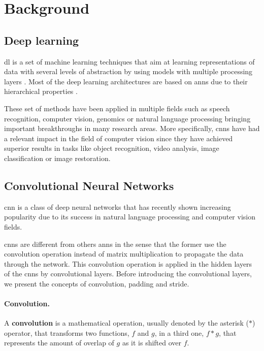 \section{Background}\label{sec:background}

\subsection{Deep learning}
\gls{dl} is a set of machine learning techniques that aim at learning representations of data with several levels of abstraction by using models with multiple processing layers \cite{DL2}. Most of the deep learning architectures are based on \glspl{ann} due to their hierarchical properties \cite{DL1} \cite{DBLP:DEEPSISR}.

These set of methods have been applied in multiple fields such as speech recognition, computer vision, genomics or natural language processing bringing important breakthroughs in many research areas. More specifically, \glspl{cnn} have had a relevant impact in the field of computer vision since they have achieved superior results in tasks like object recognition, video analysis, image classification or image restoration.

\subsection{Convolutional Neural Networks}
\gls{cnn} is a class of deep neural networks that has recently shown increasing popularity due to its success in natural language processing and computer vision fields.

\glspl{cnn} are different from others \glspl{ann} in the sense that the former use the convolution operation instead of matrix multiplication to propagate the data through the network. This convolution operation is applied in the hidden layers of the \glspl{cnn} by convolutional layers. Before introducing the convolutional layers, we present the concepts of convolution, padding and stride.

\paragraph{Convolution.} 

A \textbf{convolution} is a mathematical operation, usually denoted by the asterisk ($\ast$) operator, that transforms two functions, $f$ and $g$, in a third one, $f\ast g$, that represents the amount of overlap of $g$ as it is shifted over $f$.


